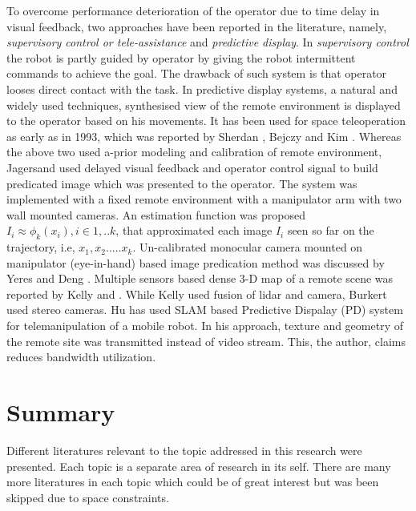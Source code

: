     To overcome performance deterioration of the operator due to time delay in visual feedback, two approaches have been reported in the literature, namely, \textit{supervisory control or tele-assistance  } and \textit{predictive display}. In \textit{supervisory control} \cite{sheridan1986human,pook1994teleassistance,jagersand1995visual} the robot is partly guided by operator by giving the robot intermittent commands to achieve the goal. The drawback of such system is that operator looses direct contact with the task.
    In  predictive display systems, a natural and widely used techniques, synthesised view of the remote environment is displayed to the operator based on his movements. It has been used for space teleoperation as early as in 1993, which was reported by Sherdan \cite{sheridan1993space}, Bejczy \cite{bejczy1990predictive} and Kim \cite{kim1993demonstration}. Whereas the above two used a-prior modeling and  calibration of remote environment, Jagersand \cite{jagersand1999image} used delayed visual feedback and operator control signal to build predicated image which was presented to the operator. The system was implemented with a fixed remote environment with a manipulator arm with  two wall mounted cameras. An estimation function was proposed 
    $I_i \approx \phi_k(x_i), i \in {1,..k}$, that approximated each image  $I_i$ seen so far on the trajectory, i.e, ${x_1, x_2 .....x_k}$. Un-calibrated monocular camera mounted on manipulator (eye-in-hand) based image predication method was discussed   by Yeres \cite{yerex2003predictive} and Deng \cite{deng2003predictive}. Multiple sensors based dense 3-D  map of a remote scene was reported by Kelly \cite{kelly2011real} and \cite{burkert2004photorealistic}. While Kelly used fusion of  lidar and  camera,  Burkert used stereo cameras. Hu \cite{hu2015line} has used SLAM based Predictive Dispalay  (PD) system for telemanipulation of a mobile robot. In his approach, texture and geometry of the remote site was transmitted instead of  video stream. This, the author, claims reduces bandwidth utilization.
    \section{Summary}
    Different literatures relevant to the topic addressed in this research were presented. Each topic is a separate area of research in its self.  There are many more literatures in each topic which could be of great interest but was been skipped due to space constraints.  

